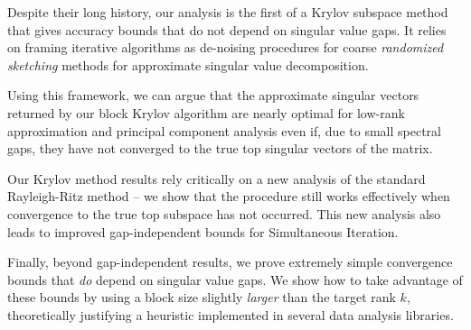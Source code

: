 \documentclass{report}
\begin{document}
Despite their long history, our analysis is the first of a Krylov
subspace method that gives accuracy bounds that do not depend on singular
value gaps. It relies on framing iterative algorithms as de-noising
procedures for coarse \emph{randomized sketching} methods for approximate
singular value decomposition.

Using this framework, we can argue that the approximate singular vectors
returned by our block Krylov algorithm are nearly optimal for low-rank
approximation and principal component analysis even if, due to small
spectral gaps, they have not converged to the true top singular vectors
of the matrix.

Our Krylov method results rely critically on a new analysis of the
standard Rayleigh-Ritz method -- we show that the procedure still works
effectively when convergence to the true top subspace has not occurred.
This new analysis also leads to improved gap-independent bounds for
Simultaneous Iteration.

Finally, beyond gap-independent results, we prove extremely simple
convergence bounds that \emph{do} depend on singular value gaps. We show
how to take advantage of these bounds by using a block size slightly
\emph{larger} than the target rank $k$, theoretically justifying a
heuristic implemented in several data analysis libraries.
\end{document}
